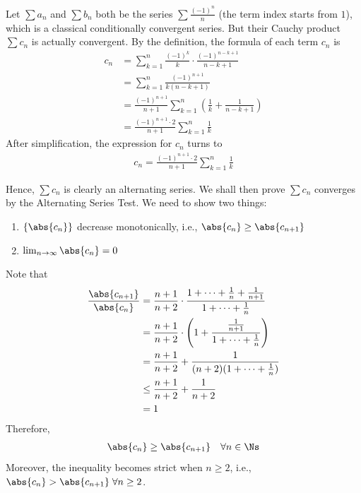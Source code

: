 \documentclass[thmcnt=section, 12pt]{elegantbook}
\begin{document}
\begin{example} \label{eg:2} %
    Let $\sum a_n$ and $\sum b_n$ both be the series $\sum \frac{(-1)^n}{n}$ (the term index starts from $1$), which is a classical conditionally convergent series. But their Cauchy product $\sum c_n$ is actually convergent. By the definition, the formula of each term $c_n$ is 
    \begin{align*}
        c_n &= \sum_{k=1}^n \frac{(-1)^k}{k} \cdot \frac{(-1)^{n-k+1}}{n-k+1} \\
        &= \sum_{k=1}^n \frac{(-1)^{n+1}}{k(n-k+1)} \\ 
        &= \frac{(-1)^{n+1}}{n+1} \sum_{k=1}^n \left( \frac{1}{k} + \frac{1}{n-k+1} \right) \\ 
        &= \frac{(-1)^{n+1} \cdot 2}{n+1} \sum_{k=1}^n \frac{1}{k}
    \end{align*}
    After simplification, the expression for $c_n$ turns to 
    \begin{align*}
        c_n = \frac{(-1)^{n+1} \cdot 2}{n+1} \sum_{k=1}^n \frac{1}{k}
    \end{align*}
    
    \par Hence, $\sum c_n$ is clearly an alternating series. We shall then prove $\sum c_n$ converges by the Alternating Series Test. We need to show two things:
    \begin{enumerate}
        \item $\left\{\abs{c_n}\right\}$ decrease monotonically, i.e., $\abs{c_n} \geq \abs{c_{n+1}}$
        \item $\lim_{n \to \infty} \abs{c_n} = 0$
    \end{enumerate}
    
    \par Note that 
    \begin{align*}
        \frac{\abs{c_{n+1}}}{\abs{c_n}}
        &= \frac{n+1}{n+2} \cdot \frac{1 + \cdots + \frac{1}{n} + \frac{1}{n+1}}{1 + \cdots + \frac{1}{n}} \\ 
        &= \frac{n+1}{n+2} \cdot \left( 1 + \frac{\frac{1}{n+1}}{1 + \cdots + \frac{1}{n}} \right) \\ 
        &= \frac{n+1}{n+2} + \frac{1}{(n+2) (1 + \cdots + \frac{1}{n})} \\ 
        &\leq \frac{n+1}{n+2} + \frac{1}{n+2} \\
        &= 1
    \end{align*}
    Therefore, 
    \begin{align*}
        \abs{c_n} \geq \abs{c_{n+1}} \quad \forall n \in \Ns
    \end{align*}
    Moreover, the inequality becomes strict when $n \geq 2$, i.e., $\abs{c_n} > \abs{c_{n+1}} \; \forall n \geq 2$.


\end{example}
\end{document}
